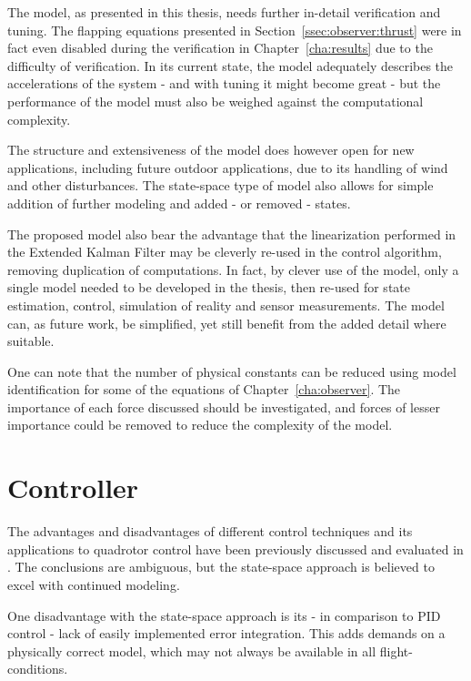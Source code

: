         The model, as presented in this thesis, needs further in-detail
        verification and tuning. The flapping equations presented in
        Section~\ref{ssec:observer:thrust} were in fact even disabled during
        the verification in Chapter~\ref{cha:results} due to the
        difficulty of verification. In its current state, the model
        adequately describes the accelerations of the system - and with tuning it might become great -
        but the performance of the model must also be weighed against
        the computational complexity.

        The structure and extensiveness of the model does however open
        for new applications, including future outdoor applications, due
        to its handling of wind and other disturbances.
        The state-space type of model also allows for simple addition
        of further modeling and added - or removed - states.

        The proposed model also bear the advantage that the
        linearization performed in the Extended Kalman Filter
        may be cleverly re-used in the control algorithm, removing duplication
        of computations. In fact, by clever use of the model,
        only a single model needed to be developed in the thesis, then re-used for
        state estimation, control, simulation of reality and sensor measurements.
        The model can, as future work, be simplified, yet still benefit from the
        added detail where suitable.

        One can note that the number of physical constants can be reduced 
        using model identification for some of the equations of Chapter~\ref{cha:observer}.
        The importance of each force discussed should be investigated,
        and forces of lesser importance could be removed to reduce the complexity of the model.

    \section{Controller}
        The advantages and disadvantages of different control techniques
        and its applications to quadrotor control have been previously
        discussed and evaluated in \citep{bouabdallah04pid}.
        The conclusions are ambiguous, but the state-space approach is believed to
        excel with continued modeling.

        One disadvantage with the state-space approach is its - in comparison
        to PID control - lack of easily implemented error integration.
        This adds demands on a physically correct model, which may
        not always be available in all flight-conditions.

